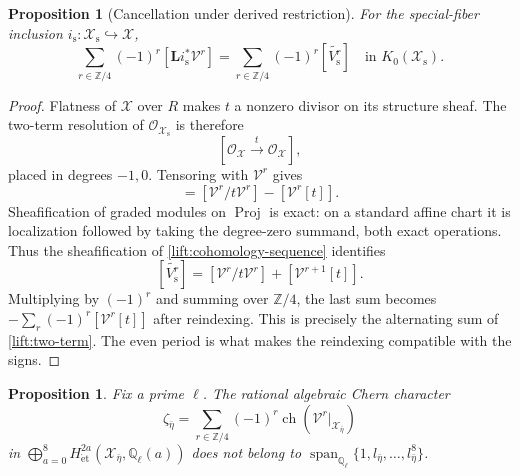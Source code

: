 \documentclass[11pt]{article}
\newtheorem{proposition}[theorem]{Proposition}
\theoremstyle{definition}
\theoremstyle{remark}
\numberwithin{equation}{section}
\begin{document}
\begin{proposition}[Cancellation under derived restriction]
\label{lift:cancellation}
For the special-fiber inclusion $i_{\mathrm s}:\mathscr X_{\mathrm s}
\hookrightarrow\mathscr X$,
\begin{equation}
 \sum_{r\in\mathbb Z/4}(-1)^r
       [\mathbf L i_{\mathrm s}^*\mathcal V^r]
 =\sum_{r\in\mathbb Z/4}(-1)^r[\widetilde{V_{\mathrm s}^r}]
 \quad\text{in }K_0(\mathscr X_{\mathrm s}).
 \label{lift:derived-equality}
\end{equation}
\end{proposition}

\begin{proof}
Flatness of $\mathscr X$ over $R$ makes $t$ a nonzero divisor on its
structure sheaf.  The two-term resolution of
$\mathcal O_{\mathscr X_{\mathrm s}}$ is therefore
\[
 [\mathcal O_{\mathscr X}\xrightarrow{\ t\ }\mathcal O_{\mathscr X}],
\]
placed in degrees $-1,0$.  Tensoring with $\mathcal V^r$ gives
\begin{equation}
 [\mathbf L i_{\mathrm s}^*\mathcal V^r]
   =[\mathcal V^r/t\mathcal V^r]-[\mathcal V^r[t]].
 \label{lift:two-term}
\end{equation}
Sheafification of graded modules on $\operatorname{Proj}$ is exact: on a standard
affine chart it is localization followed by taking the degree-zero
summand, both exact operations.  Thus the sheafification of
\eqref{lift:cohomology-sequence} identifies
\[
 [\widetilde{V_{\mathrm s}^r}]
  =[\mathcal V^r/t\mathcal V^r]+[\mathcal V^{r+1}[t]].
\]
Multiplying by $(-1)^r$ and summing over $\mathbb Z/4$, the last sum becomes
$-\sum_r(-1)^r[\mathcal V^r[t]]$ after reindexing.  This is precisely
the alternating sum of \eqref{lift:two-term}.  The even period is what
makes the reindexing compatible with the signs.
\end{proof}

\begin{proposition}
\label{lift:generic-character}
Fix a prime $\ell$.  The rational algebraic Chern character
\[
 \zeta_{\bar\eta}
   =\sum_{r\in\mathbb Z/4}(-1)^r
        \operatorname{ch}(\mathcal V^r|_{\mathscr X_{\bar\eta}})
\]
in $\bigoplus_{a=0}^8H^{2a}_{\mathrm{\acute et}}
(\mathscr X_{\bar\eta},\mathbb Q_\ell(a))$ does not belong to
$\operatorname{span}_{\mathbb Q_\ell}\{1,l_{\bar\eta},\ldots,l_{\bar\eta}^8\}$.
\end{proposition}
\end{document}
